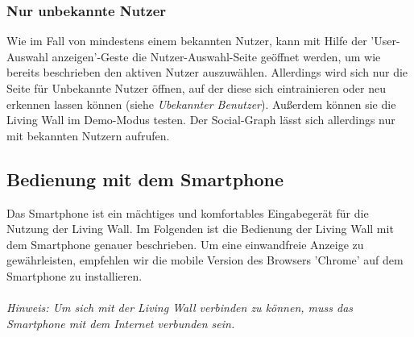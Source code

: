 \documentclass[10pt,a4paper]{report}
\begin{document}
		\subsubsection{Nur unbekannte Nutzer}
		Wie im Fall von mindestens einem bekannten Nutzer, kann mit Hilfe der 'User-Auswahl anzeigen'-Geste die Nutzer-Auswahl-Seite geöffnet werden, um wie bereits beschrieben den aktiven Nutzer auszuwählen. Allerdings wird sich nur die Seite für Unbekannte Nutzer öffnen, auf der diese sich eintrainieren oder neu erkennen lassen können (siehe \textit{Ubekannter Benutzer}). Außerdem können sie die Living Wall im Demo-Modus testen. Der Social-Graph lässt sich allerdings nur mit bekannten Nutzern aufrufen.

		\subsection{Bedienung mit dem Smartphone}
		Das Smartphone ist ein mächtiges und komfortables Eingabegerät für die Nutzung der Living Wall. Im Folgenden ist die Bedienung der Living Wall mit dem Smartphone genauer beschrieben. Um eine einwandfreie Anzeige zu gewährleisten, empfehlen wir die mobile Version des Browsers 'Chrome' auf dem Smartphone zu installieren.\\ \\
		\textit{Hinweis: Um sich mit der Living Wall verbinden zu können, muss das Smartphone mit dem Internet verbunden sein.}
\end{document}
